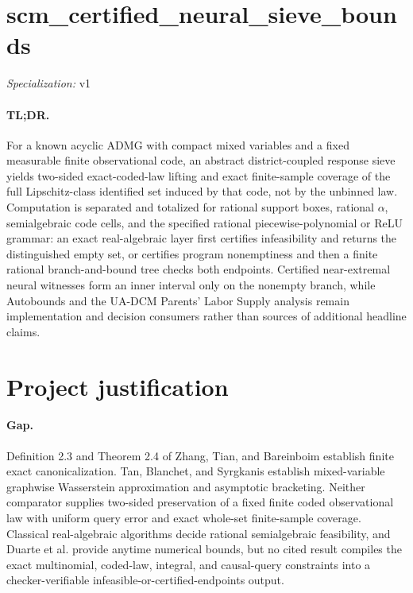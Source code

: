 \documentclass{article}
\begin{document}
\sloppy

\section*{scm\_\allowbreak{}certified\_\allowbreak{}neural\_\allowbreak{}sieve\_\allowbreak{}bounds}

\noindent\textit{Specialization:} v1\par

\paragraph{TL;DR.} For a known acyclic ADMG with compact mixed variables and a fixed measurable finite observational code, an abstract district-coupled response sieve yields two-sided exact-coded-law lifting and exact finite-sample coverage of the full Lipschitz-class identified set induced by that code, not by the unbinned law. Computation is separated and totalized for rational support boxes, rational \(\alpha\), semialgebraic code cells, and the specified rational piecewise-polynomial or ReLU grammar: an exact real-algebraic layer first certifies infeasibility and returns the distinguished empty set, or certifies program nonemptiness and then a finite rational branch-and-bound tree checks both endpoints. Certified near-extremal neural witnesses form an inner interval only on the nonempty branch, while Autobounds and the UA-DCM Parents' Labor Supply analysis remain implementation and decision consumers rather than sources of additional headline claims.

\section{Project justification}

\paragraph{Gap.} Definition 2.3 and Theorem 2.4 of Zhang, Tian, and Bareinboim establish finite exact canonicalization. Tan, Blanchet, and Syrgkanis establish mixed-variable graphwise Wasserstein approximation and asymptotic bracketing. Neither comparator supplies two-sided preservation of a fixed finite coded observational law with uniform query error and exact whole-set finite-sample coverage. Classical real-algebraic algorithms decide rational semialgebraic feasibility, and Duarte et al. provide anytime numerical bounds, but no cited result compiles the exact multinomial, coded-law, integral, and causal-query constraints into a checker-verifiable infeasible-or-certified-endpoints output.
\end{document}
